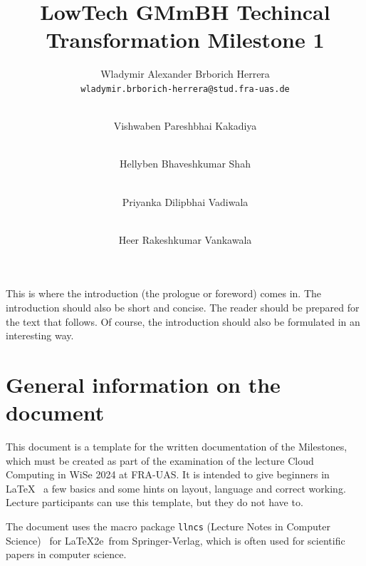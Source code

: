 \documentclass{llncs}
\newcommand{\what}{LowTech GMmBH Techincal Transformation Milestone 1}
\begin{document}
%
%
%
\mainmatter              %
%
\title{\what}
%
\author{
  Wladymir Alexander Brborich Herrera\\
  \texttt{wladymir.brborich-herrera@stud.fra-uas.de}
  \and\\ 
  Vishwaben Pareshbhai Kakadiya\\
  \texttt{}
  \and\\
  Hellyben Bhaveshkumar Shah\\
  \texttt{}
  \and\\
  Priyanka Dilipbhai Vadiwala\\
  \texttt{}
  \and\\
  Heer Rakeshkumar Vankawala\\
  \texttt{}
}
%

\maketitle              %

\begin{abstract}

\end{abstract}

This is where the introduction (the prologue or foreword) comes in. The introduction should also be short and concise. The reader should be prepared for the text that follows. Of course, the introduction should also be formulated in an interesting way.

\section{General information on the document}

This document is a template for the written documentation of the Milestones, which must be created as part of the examination of the lecture Cloud Computing in WiSe 2024 at FRA-UAS. It is intended to give beginners in \LaTeX~\cite{LaTeXWeb} a few basics and some hints on layout, language and correct working. Lecture participants can use this template, but they do not have to. 

The document uses the macro package \texttt{llncs} (Lecture Notes in Computer Science)~\cite{SpringerWeb} for \LaTeX2e\ from Springer-Verlag, which is often used for scientific papers in computer science.
\end{document}
